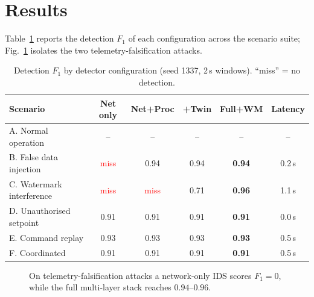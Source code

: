 \documentclass[11pt,a4paper]{article}
\begin{document}
\section{Results}
Table~\ref{tab:results} reports the detection $F_1$ of each configuration across the scenario suite; Fig.~\ref{fig:bars} isolates the two telemetry-falsification attacks.

\begin{table}[t]
\centering
\caption{Detection $F_1$ by detector configuration (seed 1337, 2\,s windows). ``miss'' = no detection.}
\label{tab:results}
\renewcommand{\arraystretch}{1.25}
\begin{tabular}{@{}lccccc@{}}
\toprule
\textbf{Scenario} & \textbf{Net only} & \textbf{Net+Proc} & \textbf{+Twin} & \textbf{Full+WM} & \textbf{Latency}\\
\midrule
A. Normal operation      & --   & --   & --   & --   & --\\
B. False data injection   & \textcolor{red}{miss} & 0.94 & 0.94 & \textbf{0.94} & 0.2\,s\\
C. Watermark interference & \textcolor{red}{miss} & \textcolor{red}{miss} & 0.71 & \textbf{0.96} & 1.1\,s\\
D. Unauthorised setpoint  & 0.91 & 0.91 & 0.91 & \textbf{0.91} & 0.0\,s\\
E. Command replay         & 0.93 & 0.93 & 0.93 & \textbf{0.93} & 0.5\,s\\
F. Coordinated            & 0.91 & 0.91 & 0.91 & \textbf{0.91} & 0.5\,s\\
\bottomrule
\end{tabular}
\end{table}

\begin{figure}[t]
\centering
{}
\caption{On telemetry-falsification attacks a network-only IDS scores $F_1=0$, while the full multi-layer stack reaches $0.94$--$0.96$.}
\label{fig:bars}
\end{figure}
\end{document}
